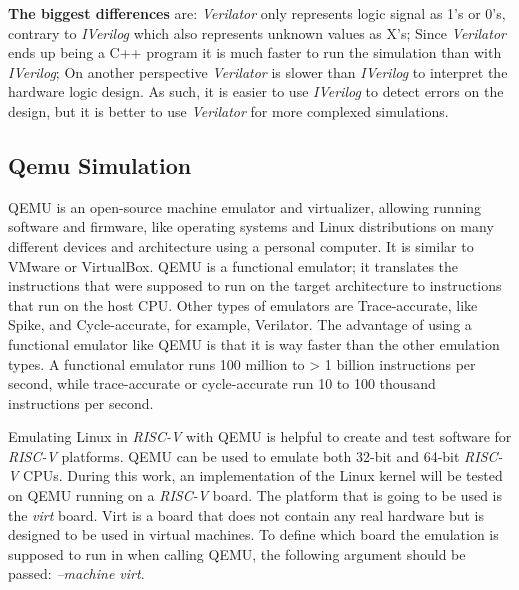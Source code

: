 \textbf{The biggest differences} are: \textit{Verilator} only represents logic signal as 1's or 0's, contrary to \textit{IVerilog} which also represents unknown values as X's; Since \textit{Verilator} ends up being a C++ program it is much faster to run the simulation than with \textit{IVerilog}; On another perspective \textit{Verilator} is slower than \textit{IVerilog} to interpret the hardware logic design.
As such, it is easier to use \textit{IVerilog} to detect errors on the design, but it is better to use \textit{Verilator} for more complexed simulations.

\subsection{Qemu Simulation}
QEMU is an open-source machine emulator and virtualizer, allowing running software and firmware, like operating systems and Linux distributions on many different devices and architecture using a personal computer. It is similar to VMware or VirtualBox. QEMU is a functional emulator; it translates the instructions that were supposed to run on the target architecture to instructions that run on the host CPU. Other types of emulators are Trace-accurate, like Spike, and Cycle-accurate, for example, Verilator. The advantage of using a functional emulator like QEMU is that it is way faster than the other emulation types. A functional emulator runs 100 million to > 1 billion instructions per second, while trace-accurate or cycle-accurate run 10 to 100 thousand instructions per second.

Emulating Linux in \textit{RISC-V} with QEMU is helpful to create and test software for \textit{RISC-V} platforms. QEMU can be used to emulate both 32-bit and 64-bit \textit{RISC-V} CPUs. During this work, an implementation of the Linux kernel will be tested on QEMU running on a \textit{RISC-V} board. The platform that is going to be used is the \textit{virt} board. Virt is a board that does not contain any real hardware but is designed to be used in virtual machines. To define which board the emulation is supposed to run in when calling QEMU, the following argument should be passed: \textit{--machine virt}.
